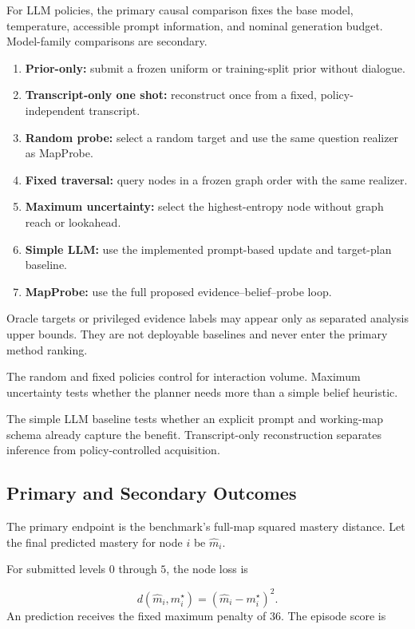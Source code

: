 For LLM policies, the primary causal comparison fixes the base model, temperature, accessible prompt
information, and nominal generation budget. Model-family comparisons are secondary.

\begin{enumerate}[leftmargin=1.7em]
    \item \textbf{Prior-only:} submit a frozen uniform or training-split prior without dialogue.
    \item \textbf{Transcript-only one shot:} reconstruct once from a fixed, policy-independent transcript.
    \item \textbf{Random probe:} select a random target and use the same question realizer as MapProbe.
    \item \textbf{Fixed traversal:} query nodes in a frozen graph order with the same realizer.
    \item \textbf{Maximum uncertainty:} select the highest-entropy node without graph reach or lookahead.
    \item \textbf{Simple LLM:} use the implemented prompt-based update and target-plan baseline.
    \item \textbf{MapProbe:} use the full proposed evidence--belief--probe loop.
\end{enumerate}

Oracle targets or privileged evidence labels may appear only as separated analysis upper bounds. They
are not deployable baselines and never enter the primary method ranking.

The random and fixed policies control for interaction volume. Maximum uncertainty tests whether the
planner needs more than a simple belief heuristic.

The simple LLM baseline tests whether an explicit prompt and working-map schema already capture the
benefit. Transcript-only reconstruction separates inference from policy-controlled acquisition.

\subsection{Primary and Secondary Outcomes}
\label{sec:evaluation}

The primary endpoint is the benchmark's full-map squared mastery distance. Let the final predicted
mastery for node $i$ be $\hat{m}_i$.

For submitted levels $0$ through $5$, the node loss is

\begin{equation}
    d(\hat{m}_i,m_i^{\star}) = (\hat{m}_i-m_i^{\star})^2.
\end{equation}
An \unknown prediction receives the fixed maximum penalty of $36$. The episode score is

